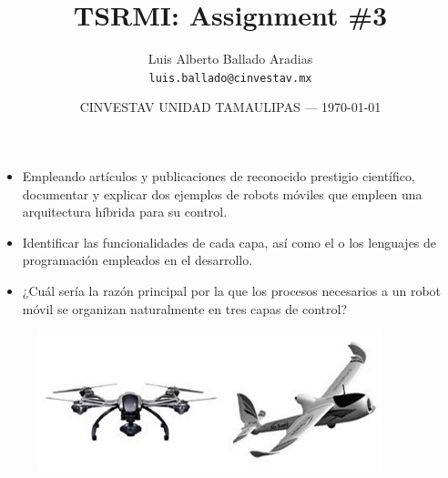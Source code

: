 \documentclass{article}
\title{TSRMI: Assignment \#3} %
\author{Luis Alberto Ballado Aradias\\ \texttt{luis.ballado@cinvestav.mx}} %
\date{CINVESTAV UNIDAD TAMAULIPAS --- \today} %
\begin{document}
\maketitle %


\begin{itemize}

\item{Empleando artículos y publicaciones de reconocido prestigio científico, documentar y explicar dos ejemplos de robots móviles que empleen una arquitectura híbrida para su control.}
\item{Identificar las funcionalidades de cada capa, así como el o los lenguajes de programación empleados en el desarrollo.}
\item{¿Cuál sería la razón principal por la que los procesos necesarios a un robot móvil se organizan naturalmente en tres capas de control?}

\end{itemize}
  
\begin{figure}[h]
\includegraphics[width=10cm]{images/vant.jpg}
\centering
\end{figure}
\end{document}
